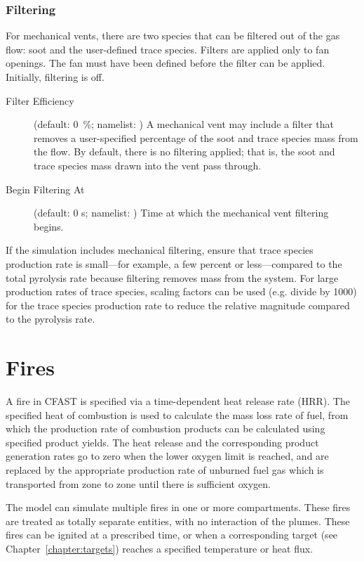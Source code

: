{{\subsection{Filtering}
\label{info:VENT5}

For mechanical vents, there are two species that can be filtered out of the gas flow: soot and the user-defined trace species. Filters are applied only to fan openings. The fan must have been defined before the filter can be applied. Initially, filtering is off.
\begin{description}
\item[Filter Efficiency] (default: 0~\%; namelist: ) A mechanical vent may include a filter that removes a user-specified percentage of the soot and trace species mass from the flow. By default, there is no filtering applied; that is, the soot and trace species mass drawn into the vent pass through.
\item[Begin Filtering At] (default: 0 s; namelist: ) Time at which the mechanical vent filtering begins.
\end{description}
If the simulation includes mechanical filtering, ensure that trace species production rate is small---for example, a few percent or less---compared to the total pyrolysis rate because filtering removes mass from the system. For large production rates of trace species, scaling factors can be used (e.g. divide by 1000) for the trace species production rate to reduce the relative magnitude compared to the pyrolysis rate.








\chapter{Fires}

A fire in CFAST is specified via a time-dependent heat release rate (HRR). The specified heat of combustion is used to calculate the mass loss rate of fuel, from which the production rate of combustion products can be calculated using specified product yields. The heat release and the corresponding product generation rates go to zero when the lower oxygen limit is reached, and are replaced by the appropriate production rate of unburned fuel gas which is transported from zone to zone until there is sufficient oxygen.

The model can simulate multiple fires in one or more compartments. These fires are treated as totally separate entities, with no interaction of the plumes. These fires can be ignited at a prescribed time, or when a corresponding target (see Chapter~\ref{chapter:targets}) reaches a specified temperature or heat flux.

}}
